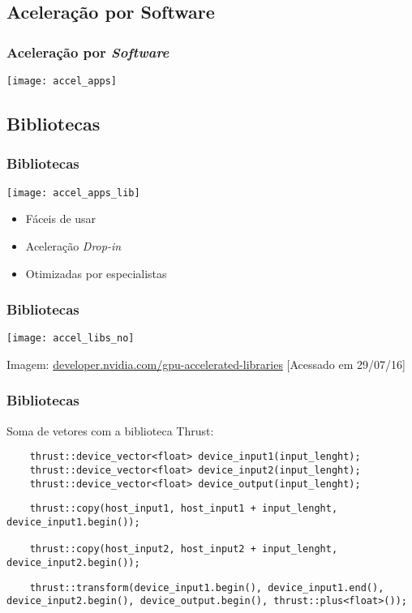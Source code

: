 \documentclass[10pt, compress, aspectratio=43, xcolor={table,usenames,dvipsnames}]{beamer}
\begin{document}
\subsection{Aceleração por Software}

\begin{frame}
    \frametitle{Aceleração por \textit{Software}}
    \centering
    \texttt{[image: accel\_apps]}
\end{frame}

\subsection{Bibliotecas}

\begin{frame}
    \frametitle{Bibliotecas}
    \begin{center}
        \texttt{[image: accel\_apps\_lib]}
    \end{center}

    \begin{itemize}
        \item Fáceis de usar
        \item Aceleração \textit{Drop-in}
        \item Otimizadas por especialistas
    \end{itemize}
\end{frame}

\begin{frame}
    \frametitle{Bibliotecas}
    \centering
    \texttt{[image: accel\_libs\_no]}
    \vfill

    \tiny{Imagem: \url{developer.nvidia.com/gpu-accelerated-libraries} [Acessado em 29/07/16]}
\end{frame}

\begin{frame}[fragile]
    \frametitle{Bibliotecas}
    Soma de vetores com a biblioteca \alert{Thrust}:
    \begin{verbatim}
    thrust::device_vector<float> device_input1(input_lenght);
    thrust::device_vector<float> device_input2(input_lenght);
    thrust::device_vector<float> device_output(input_lenght);
    \end{verbatim}

    \begin{verbatim}
    thrust::copy(host_input1, host_input1 + input_lenght, device_input1.begin());

    thrust::copy(host_input2, host_input2 + input_lenght, device_input2.begin());
    \end{verbatim}

    \begin{verbatim}
    thrust::transform(device_input1.begin(), device_input1.end(), device_input2.begin(), device_output.begin(), thrust::plus<float>());
    \end{verbatim}
\end{frame}
\end{document}
